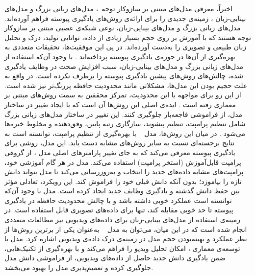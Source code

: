  
 
  اخیراً، معرفی مدل‌های مبتنی بر سازوکار توجه~\cite{bert-10,attention_is_all_u_need-46}،
 مدل‌های زبانی بزرگ    \cite{llm-example,gpt4} و مدل‌های بینایی-زبان \cite{clip,17}، زمینه‌ی جدیدی را برای ارائه‌ی روش‌های یادگیری پیوسته فراهم آورده‌اند\cite{llm_continual}. مدل‌های زبانی بزرگ و مدل‌های بینایی-زبان، نوعی شبکه‌ی عصبی مبتنی بر سازوکار توجه هستند که با آموزش بر روی حجم بسیار زیادی از داده‌، توانایی تولید، درک و تحلیل زبان طبیعی و تصویری را به‌دست آورده‌اند. در پی این موفقیت‌ها، تحقیقات متعددی به بهره‌گیری از آن‌ها در حوزه‌ی یادگیری پیوسته پرداخته‌اند \cite{llm_continual,l2p,clip-poolprompt,CoOp,ddas-2024,distillation}. با وجود آن‌که استفاده از مدل‌های زبانی بزرگ و مدل‌های بینایی-زبان، سبب افزایش صحت در وظایف یادگیری شده، چالش‌های روش‌های پیشین یادگیری پیوسته را برطرف نکرده است. در واقع به علت حجیم بودن این مدل‌ها، مشکلاتی مانند محدودیت حافظه پررنگ‌تر نیز شده است. از این رو برای مواجهه با این محدودیت، تمرکز محققین به سمت روش‌های مبتنی بر معماری رفته است \cite{llm_continual}. ایده‌ی اصلی این روش‌ها آن است که با ایجاد تغییر در ساختار مدل، از فراموشی فاجعه‌بار جلوگیری کنند. این تغییر در ساختار مدل‌های زبانی بزرگ شامل تنظیم پرامپت، تنظیم پیشوند، سازگاری رتبه پایین، وفق‌دهنده و مخلوط خبره‌ها  می‌شود \cite{llm_continual}. در میان این روش‌ها، مدل
 ~\cite{l2p}
 با بهره‌گیری از تنظیم پرامپت، توانسته است به نتایج برجسته‌ای نسبت به سایر روش‌های مشابه دست ‌یابد. این مدل، روشی برای یادگیری پیوسته معرفی می‌کند که به جای تغییر پارامترهای اصلی مدل ، از گروهی پرامپت قابل‌آموزش (استخر پرامپت) استفاده می‌کند.
مدل 
در هر گام آموزشی خود، پرامپت‌های مشابه داده‌های جدید را انتخاب و به‌روزرسانی می‌کند تا مدل بتواند دانش تازه را بیاموزد؛ بدون آنکه دانش قبلی خود را فراموش کند. این رویکرد، تعادلی مؤثر بین حفظ دانش گذشته و یادگیری وظایف جدید ایجاد کرده است. 
مدل 
با وجود آن‌که توانسته است عملکرد خوبی داشته باشد و با چالش محدودیت حافظه در یادگیری پیوسته تا حد خوبی مقابله کند، تنها برای داده‌های تصویری قابل استفاده است. 
در زمینه‌ی استفاده از مدل‌های بینایی-زبان برای داده‌های ویدیویی نیز مطالعات متعددی انجام شده است که در این میان، می‌توان به مدل
~\cite{open-vclip} 
به‌عنوان یکی از برترین روش‌ها از نظر عملکرد و بهینه‌بودن حجم مدل در زمینه‌ی درک داده‌ی ویدیویی اشاره کرد. مدل  با توسعه‌ی معماری ، امکان تحلیل ویدیو را فراهم می‌کند و با بهره‌گیری از تکنیک‌هایی، ضمن یادگیری دانش جدید حاصل از داده‌های ویدیویی، از فراموشی دانش مدل  جلوگیری کرده و تعمیم‌پذیری مدل را بهبود می‌بخشد. 

